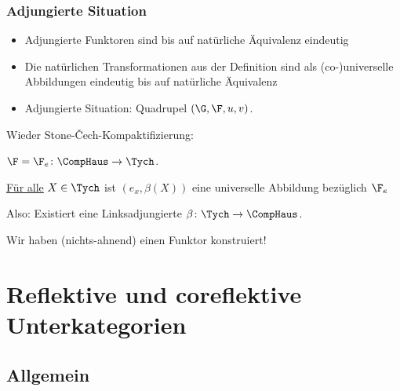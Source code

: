 \documentclass[serif,9pt]{beamer}
\begin{document}
\begin{frame}
  \frametitle{Adjungierte Situation}

  \begin{itemize}
    \item<+-> Adjungierte Funktoren sind bis auf natürliche Äquivalenz eindeutig
    \item<+-> Die natürlichen Transformationen aus der Definition sind als (co-)universelle Abbildungen eindeutig bis auf natürliche Äquivalenz
    \item<+-> Adjungierte Situation: Quadrupel $(\G, \F, u, v)$. 
  \end{itemize}

\pause

  \begin{ex*}
     Wieder Stone-\v{C}ech-Kompaktifizierung:

     $\F = \F_e \colon \CompHaus \to \Tych$.

\pause

     \underline{Für alle} $X \in \Tych$ ist $(e_x, \beta(X))$ eine universelle Abbildung bezüglich $\F_e$
     
     Also: Existiert eine Linksadjungierte $\beta \colon \Tych \to \CompHaus$.
     \vspace{1em}

\pause

     Wir haben (nichts-ahnend) einen Funktor konstruiert!
  \end{ex*}

\end{frame}


\section{Reflektive und coreflektive Unterkategorien}

\subsection{Allgemein}
\end{document}
